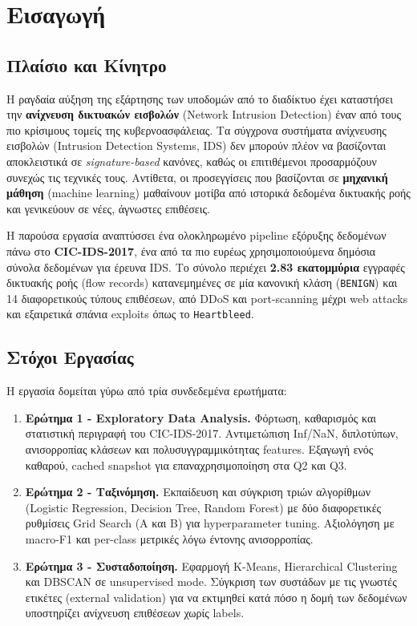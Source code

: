 \documentclass[12pt,a4paper,twoside]{book}
\begin{document}
\chapter{Εισαγωγή}

\section{Πλαίσιο και Κίνητρο}

Η ραγδαία αύξηση της εξάρτησης των υποδομών από το διαδίκτυο έχει καταστήσει
την \textbf{ανίχνευση δικτυακών εισβολών} (Network Intrusion Detection) έναν
από τους πιο κρίσιμους τομείς της κυβερνοασφάλειας. Τα σύγχρονα συστήματα
ανίχνευσης εισβολών (Intrusion Detection Systems, IDS) δεν μπορούν πλέον να
βασίζονται αποκλειστικά σε \textit{signature-based} κανόνες, καθώς οι
επιτιθέμενοι προσαρμόζουν συνεχώς τις τεχνικές τους. Αντίθετα, οι
προσεγγίσεις που βασίζονται σε \textbf{μηχανική μάθηση} (machine learning)
μαθαίνουν μοτίβα από ιστορικά δεδομένα δικτυακής ροής και γενικεύουν σε νέες,
άγνωστες επιθέσεις.

Η παρούσα εργασία αναπτύσσει ένα ολοκληρωμένο pipeline εξόρυξης δεδομένων
πάνω στο \textbf{CIC-IDS-2017}, ένα από τα πιο ευρέως χρησιμοποιούμενα
δημόσια σύνολα δεδομένων για έρευνα IDS. Το σύνολο περιέχει \textbf{2.83
εκατομμύρια} εγγραφές δικτυακής ροής (flow records) κατανεμημένες σε μία
κανονική κλάση (\texttt{BENIGN}) και 14 διαφορετικούς τύπους επιθέσεων, από
DDoS και port-scanning μέχρι web attacks και εξαιρετικά σπάνια exploits
όπως το \texttt{Heartbleed}.

\section{Στόχοι Εργασίας}

Η εργασία δομείται γύρω από τρία συνδεδεμένα ερωτήματα:

\begin{enumerate}
    \item \textbf{Ερώτημα 1 - Exploratory Data Analysis.} Φόρτωση, καθαρισμός
    και στατιστική περιγραφή του CIC-IDS-2017. Αντιμετώπιση Inf/NaN, διπλοτύπων,
    ανισορροπίας κλάσεων και πολυσυγγραμμικότητας features. Εξαγωγή ενός
    καθαρού, cached snapshot για επαναχρησιμοποίηση στα Q2 και Q3.

    \item \textbf{Ερώτημα 2 - Ταξινόμηση.} Εκπαίδευση και σύγκριση τριών
    αλγορίθμων (Logistic Regression, Decision Tree, Random Forest) με δύο
    διαφορετικές ρυθμίσεις Grid Search (A και B) για hyperparameter tuning.
    Αξιολόγηση με macro-F1 και per-class μετρικές λόγω έντονης ανισορροπίας.

    \item \textbf{Ερώτημα 3 - Συσταδοποίηση.} Εφαρμογή K-Means, Hierarchical
    Clustering και DBSCAN σε unsupervised mode. Σύγκριση των συστάδων με τις
    γνωστές ετικέτες (external validation) για να εκτιμηθεί κατά πόσο η δομή
    των δεδομένων υποστηρίζει ανίχνευση επιθέσεων χωρίς labels.
\end{enumerate}
\end{document}
